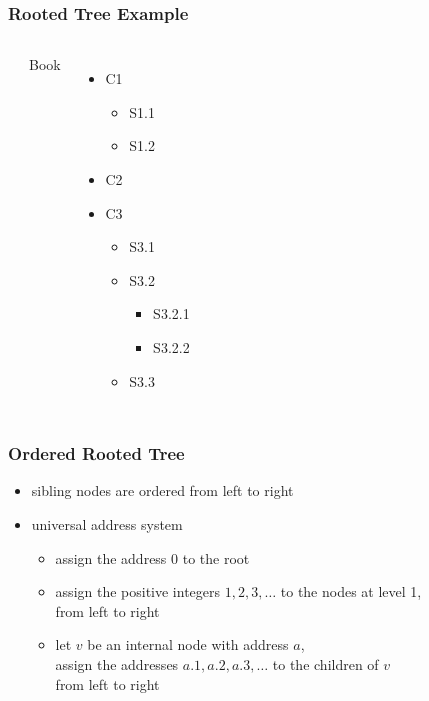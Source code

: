 \documentclass[dvipsnames]{beamer}
\begin{document}
\begin{frame}
  \frametitle{Rooted Tree Example}

  \begin{example}
    \begin{columns}
      \begin{center}
      \end{center}

      Book
      \begin{itemize}
        \item C1
        \begin{itemize}
          \item S1.1
          \item S1.2
        \end{itemize}
        \item C2
        \item C3
        \begin{itemize}
          \item S3.1
          \item S3.2
          \begin{itemize}
            \item S3.2.1
            \item S3.2.2
          \end{itemize}
          \item S3.3
        \end{itemize}
      \end{itemize}
    \end{columns}
  \end{example}
\end{frame}

\begin{frame}
  \frametitle{Ordered Rooted Tree}

  \begin{itemize}
    \item sibling nodes are ordered from left to right

    \medskip
    \item \alert{universal address system}
    \begin{itemize}
      \item assign the address $0$ to the root
      \item assign the positive integers $1,2,3,\ldots$ to the nodes at level 1,\\
        from left to right
      \item let $v$ be an internal node with address $a$,\\
        assign the addresses $a.1,a.2,a.3,\ldots$ to the children of $v$\\
        from left to right
    \end{itemize}
  \end{itemize}
\end{frame}
\end{document}
